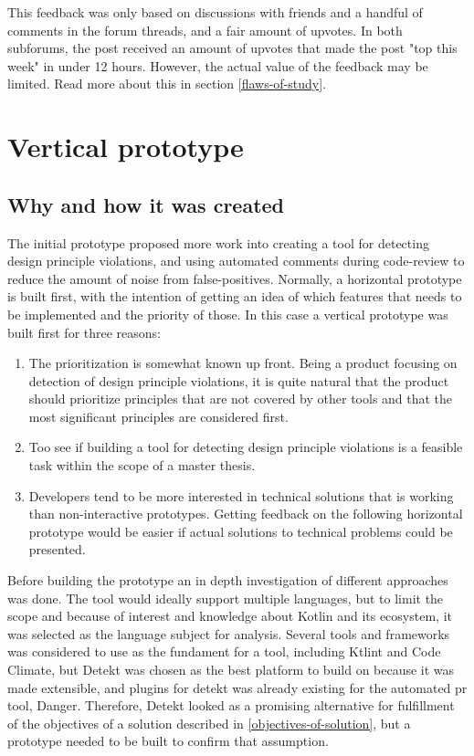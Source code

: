 \documentclass{report}
\begin{document}
This feedback was only based on discussions with friends and a handful of comments in the forum threads, and a fair amount of upvotes. In both subforums, the post received an amount of upvotes that made the post "top this week" in under 12 hours. However, the actual value of the feedback may be limited. Read more about this in section \ref{flaws-of-study}. 

\section{Vertical prototype}

\subsection*{Why and how it was created}
The initial prototype proposed more work into creating a tool for detecting design principle violations, and using automated comments during code-review to reduce the amount of noise from false-positives. Normally, a horizontal prototype is built first, with the intention of getting an idea of which features that needs to be implemented and the priority of those. In this case a vertical prototype was built first for three reasons:

\begin{enumerate}
    \item The prioritization is somewhat known up front. Being a product focusing on detection of design principle violations, it is quite natural that the product should prioritize principles that are not covered by other tools and that the most significant principles are considered first.
    \item Too see if building a tool for detecting design principle violations is a feasible task within the scope of a master thesis.
    \item Developers tend to be more interested in technical solutions that is working than non-interactive prototypes. Getting feedback on the following horizontal prototype would be easier if actual solutions to technical problems could be presented.
\end{enumerate}

Before building the prototype an in depth investigation of different approaches was done. The tool would ideally support multiple languages, but to limit the scope and because of interest and knowledge about Kotlin and its ecosystem, it was selected as the language subject for analysis. Several tools and frameworks was considered to use as the fundament for a tool, including Ktlint\cite{ktlint} and Code Climate\cite{codeclimate}, but Detekt\cite{detekt} was chosen as the best platform to build on because it was made extensible, and plugins for detekt was already existing for the automated \gls{pr} tool\cite{danger-detekt-plugin}, Danger\cite{danger}. Therefore, Detekt looked as a promising alternative for fulfillment of the objectives of a solution described in \ref{objectives-of-solution}, but a prototype needed to be built to confirm that assumption. 
\end{document}
